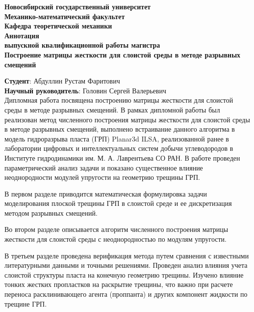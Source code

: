 \documentclass[a4paper,12pt]{article}
\begin{document}
\begin{center}
    \textbf{
        \hfill \break
        Новосибирский государственный университет\\
        Механико-математический факультет\\
        Кафедра теоретической механики\\
        \hfill \break
        Аннотация\\
        выпускной квалификационной работы магистра\\
        \hfill \break
        Построение матрицы жесткости для слоистой среды в методе разрывных смещений \\
    }
\end{center}
\textbf{Студент}: Абдуллин Рустам Фаритович\\
\textbf{Научный руководитель}: Головин Сергей Валерьевич\\

Дипломная работа посвящена построению матрицы жесткости для слоистой среды в методе разрывных смещений. В рамках дипломной работы был реализован метод численного построения матрицы жесткости для слоистой среды в методе разрывных смещений, выполнено встраивание данного алгоритма в модель гидроразрыва пласта (ГРП) Planar3d ILSA, реализованной ранее в лаборатории цифровых и интеллектуальных систем добычи углеводородов в Институте гидродинамики им. М. А. Лаврентьева СО РАН. В работе проведен параметрический анализ задачи и показано существенное влияние неоднородности модулей упругости на геометрию трещины ГРП.

В первом разделе приводится математическая формулировка задачи моделирования плоской трещины ГРП в слоистой среде и ее дискретизация методом разрывных смещений.

Во втором разделе описывается алгоритм численного построения матрицы жесткости для слоистой среды с неоднородностью по модулям упругости.

В третьем разделе проведена верификация метода путем сравнения с известными литературными данными и точными решениями. Проведен анализ влияния учета слоистой структуры пласта на конечную геометрию трещины.
Изучено влияние тонких жестких пропластков на раскрытие трещины, что важно при расчете переноса расклинивающего агента (проппанта) и других компонент жидкости по трещине ГРП.


\thispagestyle{empty} %
\end{document}
